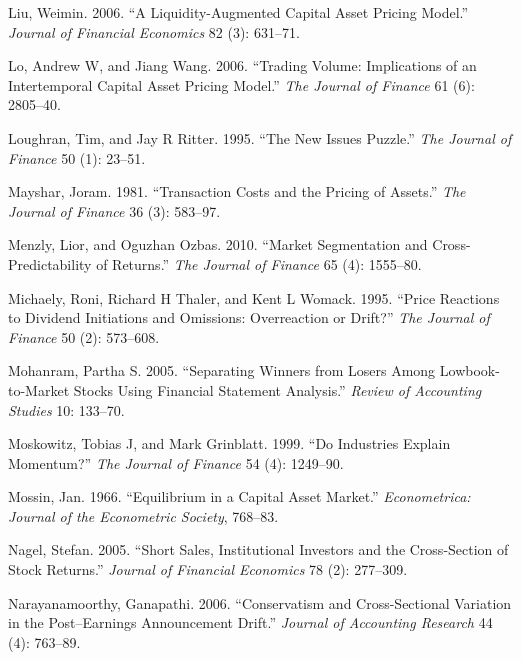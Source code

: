 \documentclass[
  letterpaper,
  DIV=11,
  numbers=noendperiod]{scrreprt}
\newlength{\cslhangindent}
\newlength{\cslentryspacingunit} %
\newenvironment{CSLReferences}[2] %
 {%
  \setlength{\parindent}{0pt}
  \ifodd #1
  \let\oldpar\par
  \def\par{\hangindent=\cslhangindent\oldpar}
  \fi
  \setlength{\parskip}{#2\cslentryspacingunit}
 }%
 {}
\begin{document}
\begin{CSLReferences}{1}{0}
\leavevmode{}%
Liu, Weimin. 2006. {``A Liquidity-Augmented Capital Asset Pricing
Model.''} \emph{Journal of Financial Economics} 82 (3): 631--71.

\leavevmode{}%
Lo, Andrew W, and Jiang Wang. 2006. {``Trading Volume: Implications of
an Intertemporal Capital Asset Pricing Model.''} \emph{The Journal of
Finance} 61 (6): 2805--40.

\leavevmode{}%
Loughran, Tim, and Jay R Ritter. 1995. {``The New Issues Puzzle.''}
\emph{The Journal of Finance} 50 (1): 23--51.

\leavevmode{}%
Mayshar, Joram. 1981. {``Transaction Costs and the Pricing of Assets.''}
\emph{The Journal of Finance} 36 (3): 583--97.

\leavevmode{}%
Menzly, Lior, and Oguzhan Ozbas. 2010. {``Market Segmentation and
Cross-Predictability of Returns.''} \emph{The Journal of Finance} 65
(4): 1555--80.

\leavevmode{}%
Michaely, Roni, Richard H Thaler, and Kent L Womack. 1995. {``Price
Reactions to Dividend Initiations and Omissions: Overreaction or
Drift?''} \emph{The Journal of Finance} 50 (2): 573--608.

\leavevmode{}%
Mohanram, Partha S. 2005. {``Separating Winners from Losers Among
Lowbook-to-Market Stocks Using Financial Statement Analysis.''}
\emph{Review of Accounting Studies} 10: 133--70.

\leavevmode{}%
Moskowitz, Tobias J, and Mark Grinblatt. 1999. {``Do Industries Explain
Momentum?''} \emph{The Journal of Finance} 54 (4): 1249--90.

\leavevmode{}%
Mossin, Jan. 1966. {``Equilibrium in a Capital Asset Market.''}
\emph{Econometrica: Journal of the Econometric Society}, 768--83.

\leavevmode{}%
Nagel, Stefan. 2005. {``Short Sales, Institutional Investors and the
Cross-Section of Stock Returns.''} \emph{Journal of Financial Economics}
78 (2): 277--309.

\leavevmode{}%
Narayanamoorthy, Ganapathi. 2006. {``Conservatism and Cross-Sectional
Variation in the Post--Earnings Announcement Drift.''} \emph{Journal of
Accounting Research} 44 (4): 763--89.


\end{CSLReferences}
\end{document}
